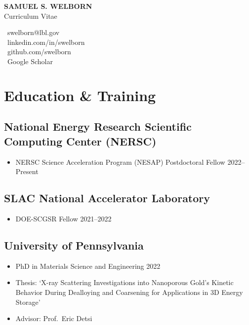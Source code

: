 \documentclass[11pt]{article} %
\begin{document}
\begin{center}
  \begin{minipage}{0.5\textwidth}
    {\LARGE\bfseries
      SAMUEL S. WELBORN
    } \\ \medskip
    Curriculum Vitae
  \end{minipage} \hfill
  \begin{minipage}{0.4\textwidth}
    \raggedleft
    {\faEnvelope} \ {swelborn@lbl.gov} \\
    \href{https://www.linkedin.com/in/swelborn}{\faLinkedin} \ linkedin.com/in/swelborn \\
    \href{https://github.com/swelborn}{\faGithub} \ github.com/swelborn \\
    \href{https://scholar.google.com/citations?user=WsQfglgAAAAJ&hl=en&authuser=1}{\faGraduationCap} \ Google Scholar
  \end{minipage}
\end{center}

\section{Education \& Training}
\subsection{National Energy Research Scientific Computing Center (NERSC)}
\begin{itemize}
  \item NERSC Science Acceleration Program (NESAP) Postdoctoral Fellow \hfill 2022--Present
\end{itemize}

\subsection{SLAC National Accelerator Laboratory}
\begin{itemize}
  \item DOE-SCGSR Fellow \hfill 2021--2022
\end{itemize}

\subsection{University of Pennsylvania}
\begin{itemize}
  \item PhD in Materials Science and Engineering \hfill 2022
  \item Thesis: `X-ray Scattering Investigations into Nanoporous Gold's Kinetic Behavior During Dealloying and Coarsening for Applications in 3D Energy Storage'
  \item Advisor: Prof.\ Eric Detsi
\end{itemize}
\end{document}
